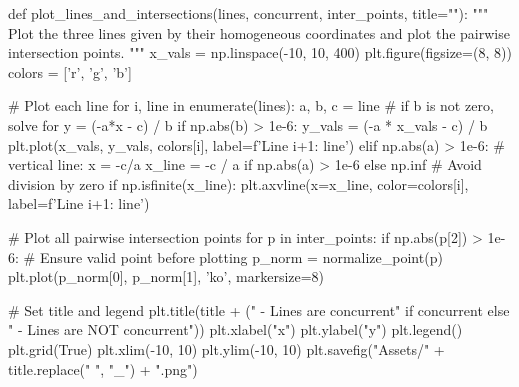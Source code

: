 def plot_lines_and_intersections(lines, concurrent, inter_points, title=""):
    """
    Plot the three lines given by their homogeneous coordinates and
    plot the pairwise intersection points.
    """
    x_vals = np.linspace(-10, 10, 400)
    plt.figure(figsize=(8, 8))
    colors = ['r', 'g', 'b']
    
    # Plot each line
    for i, line in enumerate(lines):
        a, b, c = line
        # if b is not zero, solve for y = (-a*x - c) / b
        if np.abs(b) > 1e-6:
            y_vals = (-a * x_vals - c) / b
            plt.plot(x_vals, y_vals, colors[i], label=f'Line {i+1}: {line}')
        elif np.abs(a) > 1e-6:
            # vertical line: x = -c/a
            x_line = -c / a if np.abs(a) > 1e-6 else np.inf  # Avoid division by zero
            if np.isfinite(x_line):
                plt.axvline(x=x_line, color=colors[i], label=f'Line {i+1}: {line}')
    
    # Plot all pairwise intersection points
    for p in inter_points:
        if np.abs(p[2]) > 1e-6:  # Ensure valid point before plotting
            p_norm = normalize_point(p)
            plt.plot(p_norm[0], p_norm[1], 'ko', markersize=8)
    
    # Set title and legend
    plt.title(title + (" - Lines are concurrent" if concurrent else " - Lines are NOT concurrent"))
    plt.xlabel("x")
    plt.ylabel("y")
    plt.legend()
    plt.grid(True)
    plt.xlim(-10, 10)
    plt.ylim(-10, 10)
    plt.savefig("Assets/" + title.replace(" ", "_") + ".png")